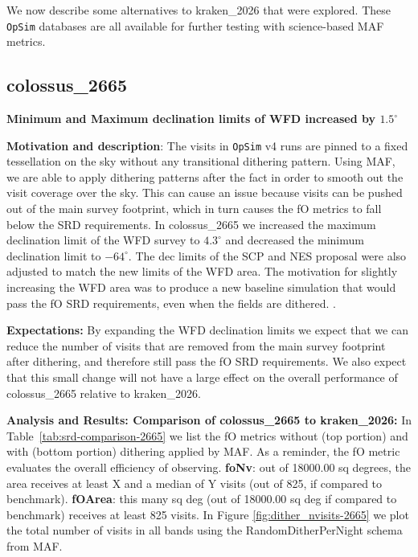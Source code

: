 \documentclass[DM,lsstdraft,authoryear,toc]{lsstdoc}
\newcommand{\opsim}{\texttt{OpSim}\xspace}
\begin{document}
We now describe some alternatives to kraken\_2026 that were explored. 
These \opsim databases are all available for further testing with science-based MAF metrics.

\subsection{colossus\_2665} \label{colossus2665}

\textbf{Minimum and Maximum declination limits of WFD increased by $1.5^{\circ}$}

\textbf{Motivation and description}: The visits in \opsim v4 runs are pinned to a fixed tessellation on the sky without any transitional dithering pattern.
Using MAF, we are able to apply dithering patterns after the fact in order to smooth out the visit coverage over the sky. This can cause an issue because
visits can be pushed out of the main survey footprint, which in turn causes the fO metrics to fall below the SRD requirements. In colossus\_2665
we increased the maximum declination limit of the WFD survey to $4.3^{\circ}$ and decreased the minimum declination limit to $-64^{\circ}$. The dec
limits of the SCP and NES proposal were also adjusted to match the new limits of the WFD area. The motivation for slightly increasing the WFD
area was to produce a new baseline simulation that would pass the fO SRD requirements, even when the fields are dithered. .


\textbf{Expectations:} By expanding the WFD declination limits we expect that we can reduce the number of visits that are removed from 
the main survey footprint after dithering, and therefore still pass the fO SRD requirements. We also expect that this small change will not have a large 
effect on the overall performance of colossus\_2665 relative to kraken\_2026.

\textbf{Analysis and Results: Comparison of colossus\_2665 to kraken\_2026:} In Table~\ref{tab:srd-comparison-2665} we list the
fO metrics without (top portion) and with (bottom portion) dithering applied by MAF. As a reminder, the fO metric evaluates the overall 
efficiency of observing. \textbf{foNv}: out of 18000.00 sq degrees, the area receives at least X and  a median of Y visits (out of 825, 
if compared to benchmark). \textbf{fOArea}: this many sq deg (out of 18000.00 sq deg if compared to benchmark) receives at least 825 visits.
In Figure \autoref{fig:dither_nvisits-2665} we plot the total number of visits in all bands using the RandomDitherPerNight schema from MAF.
\end{document}
